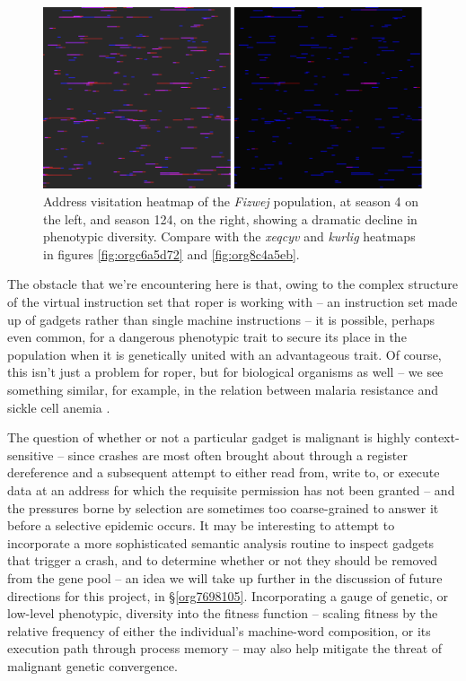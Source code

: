 \documentclass[12pt,glossary]{dalthesis}
\begin{document}
\begin{figure}[htbp]
\centering
\includegraphics[width=.9\linewidth]{../images/plots/fizwej_S124_heatmap.pdf}
\caption{\label{fig:orga9ac141}
Address visitation heatmap of the \emph{Fizwej} population, at season 4 on the left, and season 124, on the right, showing a dramatic decline in phenotypic diversity. Compare with the \emph{xeqcyv} and \emph{kurlig} heatmaps in figures \ref{fig:orgc6a5d72} and \ref{fig:org8c4a5eb}.}
\end{figure}

The obstacle that we're encountering here is that, owing to the complex structure
of the virtual instruction set that \gls{roper} is working with -- an instruction set
made up of gadgets rather than single machine instructions -- it is possible, perhaps
even common, for a dangerous phenotypic trait to secure its place in the population
when it is genetically united with an advantageous trait. Of course, this isn't just
a problem for \gls{roper}, but for biological organisms as well -- we see something
similar, for example, in the relation between malaria resistance and sickle cell
anemia \cite{haldane49}.

The question of whether or not a particular gadget is malignant is highly
context-sensitive -- since crashes are most often brought about through a
register dereference and a subsequent attempt to either read from, write to, or
execute data at an address for which the requisite permission has not been
granted -- and the pressures borne by selection are sometimes too coarse-grained
to answer it before a selective epidemic occurs. It may be interesting to
attempt to incorporate a more sophisticated semantic analysis routine to inspect
gadgets that trigger a crash, and to determine whether or not they should be
removed from the gene pool -- an idea we will take up further in the discussion
of future directions for this project, in \S \ref{org7698105}. Incorporating
a gauge of genetic, or low-level phenotypic, diversity into the fitness function
-- scaling fitness by the relative frequency of either the individual's
machine-word composition, or its execution path through process memory -- may
also help mitigate the threat of malignant genetic convergence.
\end{document}
